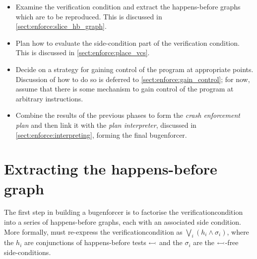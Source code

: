\begin{itemize}
\item
  Examine the verification condition and extract the happens-before
  graphs which are to be reproduced.  This is discussed in
  \autoref{sect:enforce:slice_hb_graph}.
\item
  Plan how to evaluate the side-condition part of the verification
  condition.  This is discussed in \autoref{sect:enforce:place_vcs}.
\item
  Decide on a strategy for gaining control of the program at
  appropriate points.  Discussion of how to do so is deferred to
  \autoref{sect:enforce:gain_control}; for now, assume that there is
  some mechanism to gain control of the program at arbitrary
  instructions.
\item
  Combine the results of the previous phases to form the \emph{crash
    enforcement plan} and then link it with the \emph{plan
    interpreter}, discussed in \autoref{sect:enforce:interpreting},
  forming the final \gls{bugenforcer}.
\end{itemize}

\section{Extracting the happens-before graph}
\label{sect:enforce:slice_hb_graph}


\noindent
The first step in building a \gls{bugenforcer} is to factorise the
\gls{verificationcondition} into a series of happens-before graphs,
each with an associated side condition.  More formally, {\technique}
must re-express the \gls{verificationcondition} as $\bigvee_i (h_i \wedge
\sigma_i)$, where the $h_i$ are conjunctions of happens-before tests
$\leftarrowtail$ and the $\sigma_i$ are the
$\leftarrowtail$-free side-conditions.  

